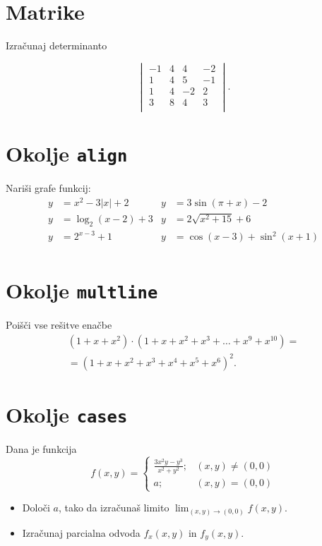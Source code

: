 \documentclass[a4paper,12pt]{article}
\begin{document}
\section*{Matrike}
Izračunaj determinanto

\[
\begin{vmatrix}
-1 & 4 & 4 & -2 \\
1 & 4 & 5 & -1 \\
1 & 4 & -2 & 2 \\
3 & 8 & 4 & 3 \\ 
\end{vmatrix}.
\]

\section*{Okolje \texttt{align}}
Nariši grafe funkcij:
\begin{align*}
y &= x^2 - 3|x| + 2 &y &= 3 \sin(\pi+x) - 2 \\
y &= \log_2(x-2) + 3 &y &= 2\sqrt{x^2+15} + 6 \\
y &= 2^{x-3} + 1 &y &= \cos(x-3)+\sin^2(x+1) \\   
\end{align*}


\section*{Okolje \texttt{multline}}
Poišči vse rešitve enačbe
\begin{multline*}
(1+x+x^2) \cdot (1+x+x^2+x^3+\ldots+x^9+x^{10}) = \\
=(1+x+x^2+x^3+x^4+x^5+x^6)^2.
\end{multline*}

\section*{Okolje \texttt{cases}}
Dana je funkcija
\[
f(x,y)= \begin{cases}
 \frac{3x^2y-y^3}{x^2+y^2}; & (x,y)\neq(0,0) \\
 a; & (x,y)=(0,0)  
\end{cases}
\]

\begin{itemize}
\item Določi \(a\), tako da izračunaš limito \( \lim_{(x,y)\to(0,0)} f(x,y) \).
\item Izračunaj parcialna odvoda \(f_x(x,y)\) in \(f_y(x,y)\).
\end{itemize}
\end{document}
